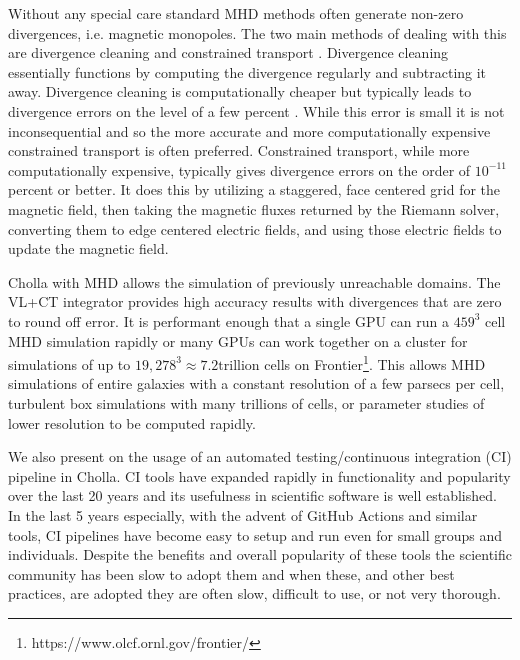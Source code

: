 Without any special care standard MHD methods often generate non-zero divergences, i.e. magnetic monopoles. The two main methods of dealing with this are divergence cleaning \citep{dedner_hyperbolic_2002} and constrained transport \citep{evans_1988}. Divergence cleaning essentially functions by computing the divergence regularly and subtracting it away. Divergence cleaning is computationally cheaper but typically leads to divergence errors on the level of a few percent \citep{pakmor_2020}. While this error is small it is not inconsequential and so the more accurate and more computationally expensive constrained transport is often preferred. Constrained transport, while more computationally expensive, typically gives divergence errors on the order of $10^{-11}$ percent or better. It does this by utilizing a staggered, face centered grid for the magnetic field, then taking the magnetic fluxes returned by the Riemann solver, converting them to edge centered electric fields, and using those electric fields to update the magnetic field\citep{stone_athena_2008}.

Cholla with MHD allows the simulation of previously unreachable domains. The VL+CT integrator provides high accuracy results with divergences that are zero to round off error. It is performant enough that a single GPU can run a $459^3$ cell MHD simulation rapidly or many GPUs can work together on a cluster for simulations of up to $19,278^3 \approx 7.2 \text{trillion}$ cells on Frontier\footnote{https://www.olcf.ornl.gov/frontier/}. This allows MHD simulations of entire galaxies with a constant resolution of a few parsecs per cell, turbulent box simulations with many trillions of cells, or parameter studies of lower resolution to be computed rapidly.

We also present on the usage of an automated testing/continuous integration (CI) pipeline in Cholla. CI tools have expanded rapidly in functionality and popularity over the last 20 years and its usefulness in scientific software is well established\citep{beck_1999, wilson_2014,wilson_2017}. In the last 5 years especially, with the advent of GitHub Actions and similar tools, CI pipelines have become easy to setup and run even for small groups and individuals. Despite the benefits and overall popularity of these tools the scientific community has been slow to adopt them and when these, and other best practices, are adopted they are often slow, difficult to use, or not very thorough. 

